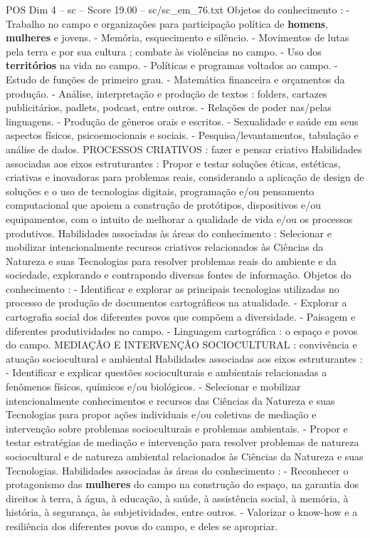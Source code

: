 \begin{textsample}{POS Dim 4 – sc – Score 19.00 – sc/sc\_em\_76.txt}
Objetos do conhecimento : - Trabalho no campo e organizações para participação política de \textbf{homens}, \textbf{mulheres} e jovens. - Memória, esquecimento e silêncio. - Movimentos de lutas pela terra e por sua cultura ; combate às violências no campo. - Uso dos \textbf{territórios} na vida no campo. - Políticas e programas voltados ao campo. - Estudo de funções de primeiro grau. - Matemática financeira e orçamentos da produção. - Análise, interpretação e produção de textos : folders, cartazes publicitários, padlets, podcast, entre outros. - Relações de poder nas/pelas linguagens. - Produção de gêneros orais e escritos. - Sexualidade e saúde em seus aspectos físicos, psicoemocionais e sociais. - Pesquisa/levantamentos, tabulação e análise de dados.
PROCESSOS CRIATIVOS : fazer e pensar criativo Habilidades associadas aos eixos estruturantes : Propor e testar soluções éticas, estéticas, criativas e inovadoras para problemas reais, considerando a aplicação de design de soluções e o uso de tecnologias digitais, programação e/ou pensamento computacional que apoiem a construção de protótipos, dispositivos e/ou equipamentos, com o intuito de melhorar a qualidade de vida e/ou os processos produtivos.
Habilidades associadas às áreas do conhecimento : Selecionar e mobilizar intencionalmente recursos criativos relacionados às Ciências da Natureza e suas Tecnologias para resolver problemas reais do ambiente e da sociedade, explorando e contrapondo diversas fontes de informação.
Objetos do conhecimento : - Identificar e explorar as principais tecnologias utilizadas no processo de produção de documentos cartográficos na atualidade. - Explorar a cartografia social dos diferentes povos que compõem a diversidade. - Paisagem e diferentes produtividades no campo. - Linguagem cartográfica : o espaço e povos do campo.
MEDIAÇÃO E INTERVENÇÃO SOCIOCULTURAL : convivência e atuação sociocultural e ambiental Habilidades associadas aos eixos estruturantes : - Identificar e explicar questões socioculturais e ambientais relacionadas a fenômenos físicos, químicos e/ou biológicos. - Selecionar e mobilizar intencionalmente conhecimentos e recursos das Ciências da Natureza e suas Tecnologias para propor ações individuais e/ou coletivas de mediação e intervenção sobre problemas socioculturais e problemas ambientais. - Propor e testar estratégias de mediação e intervenção para resolver problemas de natureza sociocultural e de natureza ambiental relacionados às Ciências da Natureza e suas Tecnologias.
Habilidades associadas às áreas do conhecimento : - Reconhecer o protagonismo das \textbf{mulheres} do campo na construção do espaço, na garantia dos direitos à terra, à água, à educação, à saúde, à assistência social, à memória, à história, à segurança, às subjetividades, entre outros. - Valorizar o know-how e a resiliência dos diferentes povos do campo, e deles se apropriar.

\end{textsample}
